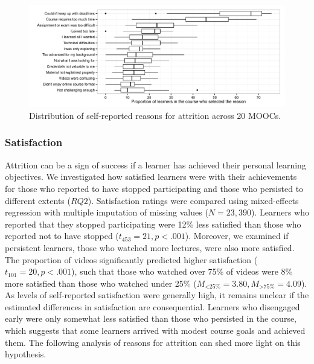 \documentclass{sigchi}\usepackage[]{graphicx}\usepackage[]{color}
\makeatletter
\def\maxwidth{ %
  \ifdim\Gin@nat@width>\linewidth
    \linewidth
  \else
    \Gin@nat@width
  \fi
}
\newenvironment{knitrout}{}{} %
\makeatother
\begin{document}
\begin{knitrout}
\color{fgcolor}\begin{figure}[ht]

\includegraphics[width=\maxwidth]{figure/s1reason} \caption[Distribution of self-reported reasons for attrition across 20 MOOCs]{Distribution of self-reported reasons for attrition across 20 MOOCs.\label{fig:s1reason}}
\end{figure}


\end{knitrout}

\subsubsection{Satisfaction}

Attrition can be a sign of success if a learner has achieved their personal learning objectives. We investigated how satisfied learners were with their achievements for those who reported to have stopped participating and those who persisted to different extents ($RQ2$). Satisfaction ratings were compared using mixed-effects regression with multiple imputation of missing values ($N=23,390$). Learners who reported that they stopped participating were 12\% less satisfied than those who reported not to have stopped ($t_{453}=21, p<.001$). Moreover, we examined if persistent learners, those who watched more lectures, were also more satisfied. The proportion of videos significantly predicted higher satisfaction ($t_{101}=20, p<.001$), such that those who watched over 75\% of videos were 8\% more satisfied than those who watched under 25\% ($M_{<\text{25\%}}=3.80, M_{>\text{75\%}}=4.09$). As levels of self-reported satisfaction were generally high, it remains unclear if the estimated differences in satisfaction are consequential. Learners who disengaged early were only somewhat less satisfied than those who persisted in the course, which suggests that some learners arrived with modest course goals and achieved them. The following analysis of reasons for attrition can shed more light on this hypothesis.
\end{document}
